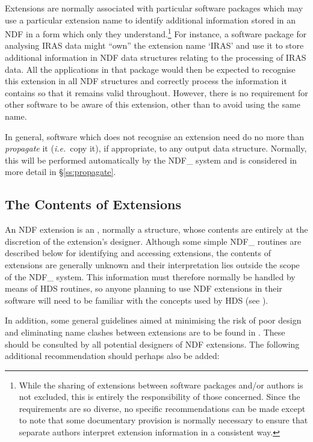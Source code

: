 \documentclass[twoside,11pt,nolof]{starlink}
\providecommand{\st}[1]{{\emph{#1}}}
\begin{document}
Extensions are normally associated with particular software packages which
may use a particular extension name to identify additional information
stored in an NDF in a form which only they understand.\footnote{While the
sharing of extensions between software packages and/or authors is not
excluded, this is entirely the responsibility of those concerned. Since the
requirements are so diverse, no specific recommendations can be made except
to note that some documentary provision is normally necessary to ensure that
separate authors interpret extension information in a consistent way.}
For instance, a software package for analysing IRAS data might ``own'' the
extension name `IRAS' and use it to store additional information in NDF data
structures relating to the processing of IRAS data.
All the applications in that package would then be expected to recognise
this extension in all NDF structures and correctly process the information
it contains so that it remains valid throughout.
However, there is no requirement for other software to be aware of this
extension, other than to avoid using the same name.

In general, software which does not recognise an extension need do no more
than \st{propagate\/} it (\st{i.e.}\ copy it), if appropriate, to any output
data structure.
Normally, this will be performed automatically by the NDF\_ system and is
considered in more detail in \S\ref{ss:propagate}.

\subsection{The Contents of Extensions}

An NDF extension is an , normally
a structure, whose contents are entirely at the discretion of the
extension's designer.
Although some simple NDF\_ routines are described below for identifying and
accessing extensions, the contents of extensions are generally unknown and
their interpretation lies outside the scope of the NDF\_ system.
This information must therefore normally be handled by means of HDS
routines, so anyone planning to use NDF extensions in their software will
need to be familiar with the concepts used by HDS (see
).

In addition, some general guidelines aimed at minimising the risk of poor
design and eliminating name clashes between extensions are to be found in
.
These should be consulted by all potential designers of NDF extensions.
The following additional recommendation should perhaps also be added:
\end{document}
